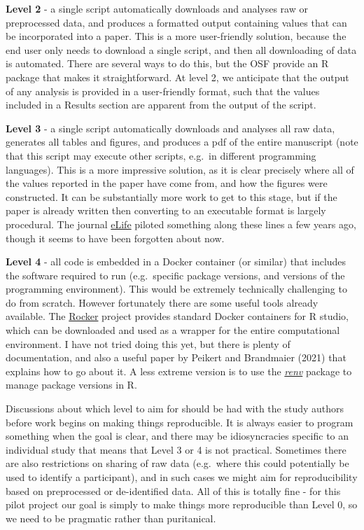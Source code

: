 \documentclass[
]{article}
\begin{document}
\textbf{Level 2} - a single script automatically downloads and analyses raw or preprocessed data, and produces a formatted output containing values that can be incorporated into a paper. This is a more user-friendly solution, because the end user only needs to download a single script, and then all downloading of data is automated. There are several ways to do this, but the OSF provide an R package that makes it straightforward. At level 2, we anticipate that the output of any analysis is provided in a user-friendly format, such that the values included in a Results section are apparent from the output of the script.

\textbf{Level 3} - a single script automatically downloads and analyses all raw data, generates all tables and figures, and produces a pdf of the entire manuscript (note that this script may execute other scripts, e.g.~in different programming languages). This is a more impressive solution, as it is clear precisely where all of the values reported in the paper have come from, and how the figures were constructed. It can be substantially more work to get to this stage, but if the paper is already written then converting to an executable format is largely procedural. The journal \href{https://elifesciences.org/}{eLife} piloted something along these lines a few years ago, though it seems to have been forgotten about now.

\textbf{Level 4} - all code is embedded in a Docker container (or similar) that includes the software required to run (e.g.~specific package versions, and versions of the programming environment). This would be extremely technically challenging to do from scratch. However fortunately there are some useful tools already available. The \href{https://rocker-project.org/}{Rocker} project provides standard Docker containers for R studio, which can be downloaded and used as a wrapper for the entire computational environment. I have not tried doing this yet, but there is plenty of documentation, and also a useful paper by Peikert and Brandmaier (2021) that explains how to go about it. A less extreme version is to use the \href{https://rstudio.github.io/renv/articles/renv.html}{\emph{renv}} package to manage package versions in R.

Discussions about which level to aim for should be had with the study authors before work begins on making things reproducible. It is always easier to program something when the goal is clear, and there may be idiosyncracies specific to an individual study that means that Level 3 or 4 is not practical. Sometimes there are also restrictions on sharing of raw data (e.g.~where this could potentially be used to identify a participant), and in such cases we might aim for reproducibility based on preprocessed or de-identified data. All of this is totally fine - for this pilot project our goal is simply to make things more reproducible than Level 0, so we need to be pragmatic rather than puritanical.
\end{document}
